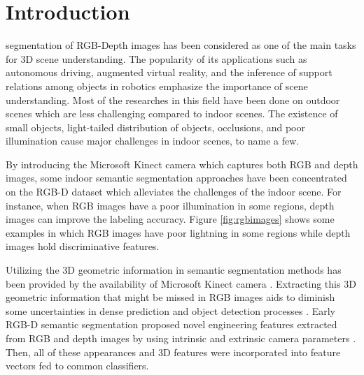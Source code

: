 \documentclass[journal,transmag]{IEEEtran}
\begin{document}
\maketitle


\IEEEdisplaynontitleabstractindextext








\IEEEpeerreviewmaketitle



\section{Introduction}

 segmentation of RGB-Depth images has been considered as one of the main tasks for 3D scene understanding. The popularity of its applications such as autonomous driving, augmented virtual reality, and the inference of support relations among objects in robotics emphasize the importance of scene understanding. Most of the researches in this field have been done on outdoor scenes which are less challenging compared to indoor scenes. The existence of small objects, light-tailed distribution of objects, occlusions, and poor illumination cause major challenges in indoor scenes, to name a few.

By introducing the Microsoft Kinect camera \cite{kinect} which captures both RGB and depth images, some indoor semantic segmentation approaches have been concentrated on the RGB-D dataset which alleviates the challenges of the indoor scene. For instance, when RGB images have a poor illumination in some regions, depth images can improve the labeling accuracy.  Figure \ref{fig:rgbimages} shows some examples in which RGB images have poor lightning in some regions while depth images hold discriminative features. 

Utilizing the 3D geometric information in semantic segmentation methods has been provided by the availability of Microsoft Kinect camera \cite{silberman2011indoor}. Extracting this 3D geometric information that might be missed in RGB images aids to diminish some uncertainties in dense prediction and object detection processes \cite{ren2012rgb, silberman2012indoor}.  Early RGB-D semantic segmentation proposed novel engineering features extracted from RGB and depth images  by using intrinsic and extrinsic camera parameters \cite{ren2012rgb, cadena2013semantic, silberman2012indoor, gupta2013perceptual, gupta2014learning}. Then, all of these appearances and 3D features were incorporated into feature vectors fed to common classifiers. 
\end{document}
